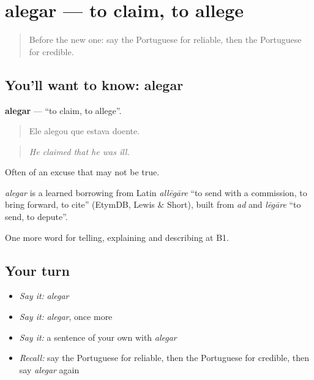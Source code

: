 \section[alegar]{alegar — to claim, to allege}

\label{lesson:PT-C342-alegar}



\begin{quote}
Before the new one: say the Portuguese for reliable, then the Portuguese for credible.
\end{quote}

\subsection*{You'll want to know: alegar}
\textbf{alegar} — \textquotedblleft{}to claim, to allege\textquotedblright{}.

\begin{quote}
Ele alegou que estava doente.
\end{quote}

\begin{quote}
\emph{He claimed that he was ill.}
\end{quote}

Often of an excuse that may not be true.

\begin{cousinweb}
\emph{alegar} is a learned borrowing from Latin \emph{allēgāre} \textquotedblleft{}to send with a commission, to bring forward, to cite\textquotedblright{} (EtymDB, Lewis \& Short), built from \emph{ad} and \emph{lēgāre} \textquotedblleft{}to send, to depute\textquotedblright{}.
\end{cousinweb}

\begin{grammarlens}[title={What you've built}]
One more word for telling, explaining and describing at B1.
\end{grammarlens}

\subsection*{Your turn}
\begin{itemize}
\raggedright
  \item \emph{Say it:} \emph{alegar}
  \item \emph{Say it:} \emph{alegar}, once more
  \item \emph{Say it:} a sentence of your own with \emph{alegar}
  \item \emph{Recall:} say the Portuguese for reliable, then the Portuguese for credible, then say \emph{alegar} again
\end{itemize}

